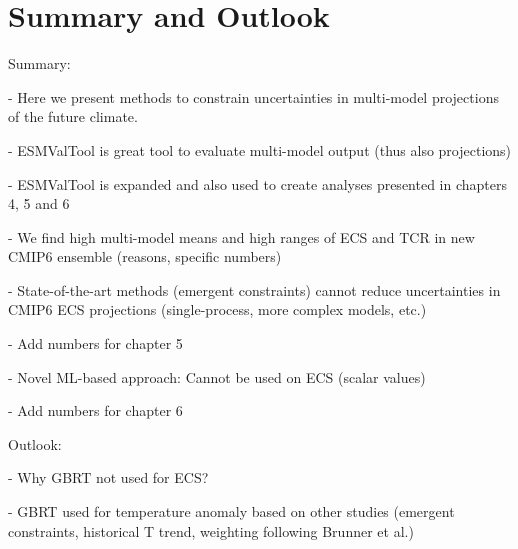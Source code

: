 


\chapter{Summary and Outlook}
\label{ch:07:summary_outlook}

Summary:

- Here we present methods to constrain uncertainties in multi-model projections
of the future climate.

- ESMValTool is great tool to evaluate multi-model output (thus also
projections)

- ESMValTool is expanded and also used to create analyses presented in chapters
4, 5 and 6

- We find high multi-model means and high ranges of ECS and TCR in new CMIP6
ensemble (reasons, specific numbers)

- State-of-the-art methods (emergent constraints) cannot reduce uncertainties
in CMIP6 ECS projections (single-process, more complex models, etc.)

- Add numbers for chapter 5

- Novel ML-based approach: Cannot be used on ECS (scalar values)

- Add numbers for chapter 6


Outlook:

- Why GBRT not used for ECS?

- GBRT used for temperature anomaly based on other studies (emergent
constraints, historical T trend, weighting following Brunner et al.)

